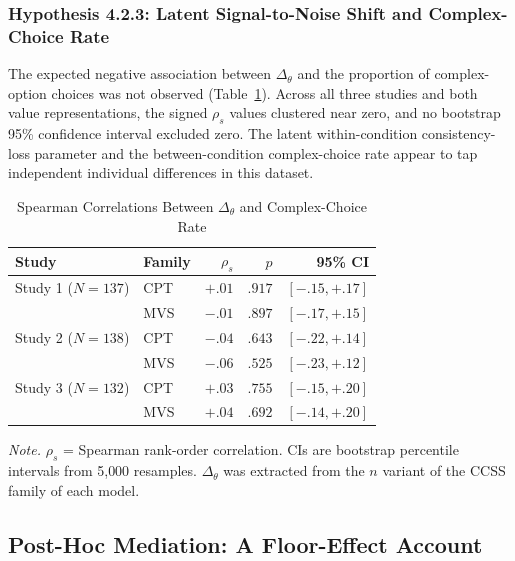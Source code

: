 \documentclass[man,floatsintext]{apa7}
\begin{document}
\subsubsection{Hypothesis 4.2.3: Latent Signal-to-Noise Shift and Complex-Choice Rate}

The expected negative association between $\Delta_\theta$ and the proportion of complex-option choices was not observed (Table~\ref{tab:dtheta_pcomplex}). Across all three studies and both value representations, the signed $\rho_s$ values clustered near zero, and no bootstrap 95\% confidence interval excluded zero. The latent within-condition consistency-loss parameter and the between-condition complex-choice rate appear to tap independent individual differences in this dataset.

\begin{table}[!htbp]
\centering
\begin{threeparttable}
\caption{Spearman Correlations Between $\Delta_\theta$ and Complex-Choice Rate}
\label{tab:dtheta_pcomplex}
\begin{tabular}{llrrr}
\toprule
\textbf{Study} & \textbf{Family} & $\rho_s$ & $p$ & \textbf{95\% CI} \\
\midrule
Study 1 ($N = 137$) & CPT  & $+.01$ & $.917$ & $[-.15, +.17]$ \\
                    & MVS  & $-.01$ & $.897$ & $[-.17, +.15]$ \\
Study 2 ($N = 138$) & CPT  & $-.04$ & $.643$ & $[-.22, +.14]$ \\
                    & MVS  & $-.06$ & $.525$ & $[-.23, +.12]$ \\
Study 3 ($N = 132$) & CPT  & $+.03$ & $.755$ & $[-.15, +.20]$ \\
                    & MVS  & $+.04$ & $.692$ & $[-.14, +.20]$ \\
\bottomrule
\end{tabular}
\begin{tablenotes}[flushleft]
\small
\item \textit{Note.} $\rho_s$ = Spearman rank-order correlation. CIs are bootstrap percentile intervals from 5{,}000 resamples. $\Delta_\theta$ was extracted from the $n$ variant of the CCSS family of each model.
\end{tablenotes}
\end{threeparttable}
\end{table}

\subsection{Post-Hoc Mediation: A Floor-Effect Account}
\end{document}
